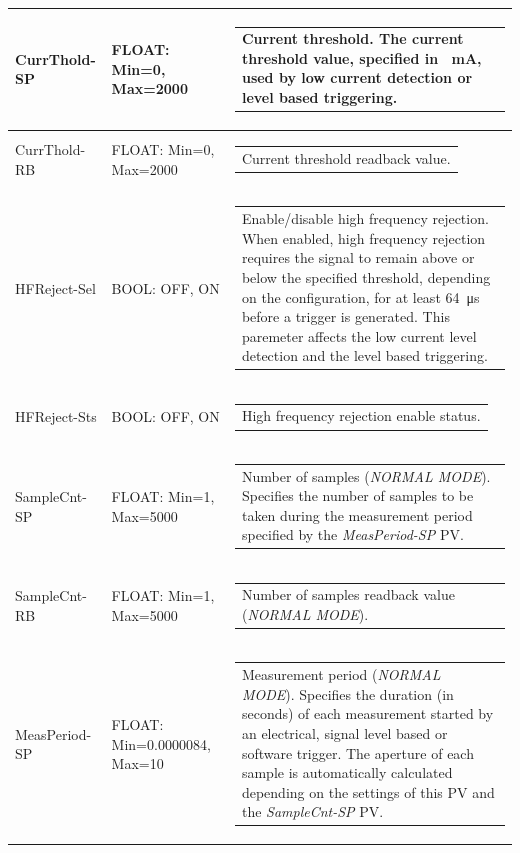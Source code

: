 \documentclass[openany]{article}
\begin{document}
\begin{longtable}{| m{3.0cm} m{4.5cm} m{7.0cm} |}
		CurrThold-SP & FLOAT: Min=0, Max=2000 & \begin{tabular}{@{}m{6cm}@{}}
	    					Current threshold. The current threshold value, specified in \SI{}{\milli\ampere}, used by low current detection or level based triggering.
						\end{tabular} \\ \hline
		CurrThold-RB & FLOAT: Min=0, Max=2000 & \begin{tabular}{@{}m{6cm}@{}}
	    					Current threshold readback value.
						\end{tabular} \\ \hline
		HFReject-Sel & BOOL: OFF, ON & \begin{tabular}{@{}m{6cm}@{}}
	    					Enable/disable high frequency rejection. When enabled, high frequency rejection requires the signal to remain above or below the specified threshold, depending on the configuration, for at least \SI{64}{\micro\second} before a trigger is generated. This paremeter affects the low current level detection and the level based triggering.
						\end{tabular} \\ \hline
		HFReject-Sts & BOOL: OFF, ON & \begin{tabular}{@{}m{6cm}@{}}
	    					High frequency rejection enable status.
						\end{tabular} \\ \hline
		SampleCnt-SP & FLOAT: Min=1, Max=5000 & \begin{tabular}{@{}m{6cm}@{}}
	    					Number of samples (\emph{NORMAL MODE}). Specifies the number of samples to be taken during the measurement period specified by the \emph{MeasPeriod-SP} PV.
						\end{tabular} \\ \hline
		SampleCnt-RB & FLOAT: Min=1, Max=5000 & \begin{tabular}{@{}m{6cm}@{}}
	    					Number of samples readback value (\emph{NORMAL MODE}).
						\end{tabular} \\ \hline
		MeasPeriod-SP & FLOAT: Min=0.0000084, Max=10 & \begin{tabular}{@{}m{6cm}@{}}
	    					Measurement period (\emph{NORMAL MODE}). Specifies the duration (in seconds) of each measurement started by an electrical, signal level based or software trigger. The aperture of each sample is automatically calculated depending on the settings of this PV and the \emph{SampleCnt-SP} PV.

\end{tabular}
\end{longtable}
\end{document}

